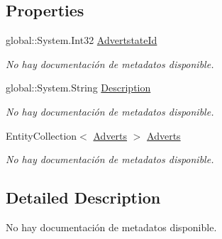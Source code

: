 \subsection*{Properties}
\begin{DoxyCompactItemize}
\item 
global\-::\-System.\-Int32 \hyperlink{class_microsoft_1_1_samples_1_1_kinect_1_1_basic_interactions_1_1_advert_states_a39f4422e188680ce289c8e4d5952931d}{Advertstate\-Id}
\begin{DoxyCompactList}\small\item\em No hay documentación de metadatos disponible. \end{DoxyCompactList}\item 
global\-::\-System.\-String \hyperlink{class_microsoft_1_1_samples_1_1_kinect_1_1_basic_interactions_1_1_advert_states_ac4134938a625db21f835d8f718deec27}{Description}
\begin{DoxyCompactList}\small\item\em No hay documentación de metadatos disponible. \end{DoxyCompactList}\item 
Entity\-Collection$<$ \hyperlink{class_microsoft_1_1_samples_1_1_kinect_1_1_basic_interactions_1_1_adverts}{Adverts} $>$ \hyperlink{class_microsoft_1_1_samples_1_1_kinect_1_1_basic_interactions_1_1_advert_states_a4be5eed57952b948cb3828bde074bda3}{Adverts}
\begin{DoxyCompactList}\small\item\em No hay documentación de metadatos disponible. \end{DoxyCompactList}\end{DoxyCompactItemize}


\subsection{Detailed Description}
No hay documentación de metadatos disponible. 



